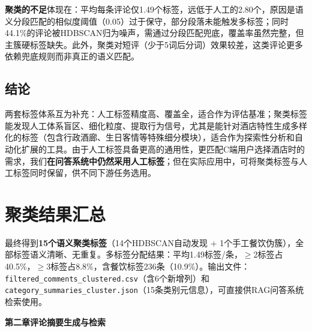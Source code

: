 \documentclass[11pt, a4paper]{article}
\begin{document}
\textbf{聚类的不足}体现在：平均每条评论仅1.49个标签，远低于人工的2.80个，原因是语义分段匹配的相似度阈值（0.05）过于保守，部分段落未能触发多标签；同时44.1\%的评论被HDBSCAN归为噪声，需通过分段匹配兜底，覆盖率虽然完整，但主簇硬标签缺失。此外，聚类对短评（少于5词后分词）效果较差，这类评论更多依赖兜底规则而非真正的语义匹配。

\subsection{结论}

两套标签体系互为补充：人工标签精度高、覆盖全，适合作为评估基准；聚类标签能发现人工体系盲区、细化粒度、提取行为信号，尤其是能针对酒店特性生成多样化的标签（包含行政酒廊、生日客情等特殊细分模块），适合作为探索性分析和自动化扩展的工具。由于人工标签具备更高的通用性，更匹配C端用户选择酒店时的需求，我们\textbf{在问答系统中仍然采用人工标签}；但在实际应用中，可将聚类标签与人工标签同时保留，供不同下游任务选用。

\section{聚类结果汇总}

\begin{notebox}[聚类分析最终结果]
最终得到\textbf{15个语义聚类标签}（14个HDBSCAN自动发现 + 1个手工餐饮伪簇），全部标签语义清晰、无重复。多标签分配结果：平均1.49标签/条，$\geq$2标签占40.5\%，$\geq$3标签占8.8\%，含餐饮标签236条（10.9\%）。输出文件：\texttt{filtered\_comments\_clustered.csv}（含6个新增列）和 \texttt{category\_summaries\_cluster.json}（15条类别元信息），可直接供RAG问答系统检索使用。
\end{notebox}


\vspace{1.5em}

\setcounter{section}{0}
\renewcommand{\thesection}{2.\arabic{section}}
\begin{center}
  {\Large\bfseries\heiti 第二章\quad 评论摘要生成与检索}\\[0.3em]
  {\small }
\end{center}
\vspace{0.5em}

\end{document}

